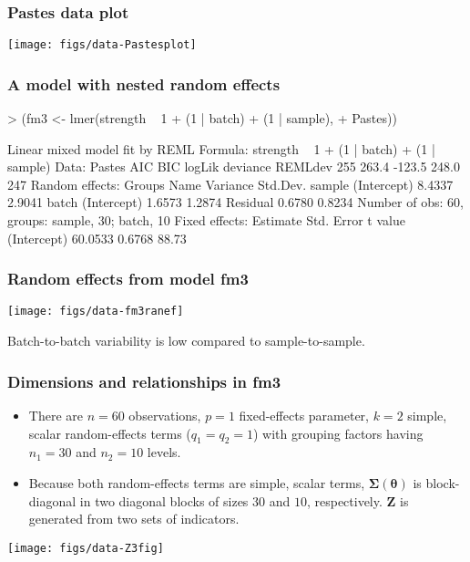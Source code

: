 \begin{frame}[fragile]
  \frametitle{Pastes data plot}
\texttt{[image: figs/data-Pastesplot]}
\end{frame}

\begin{frame}[fragile]
  \frametitle{A model with nested random effects}
\begin{Schunk}
\begin{Sinput}
> (fm3 <- lmer(strength ~ 1 + (1 | batch) + (1 | sample), 
+     Pastes))
\end{Sinput}
\begin{Soutput}
Linear mixed model fit by REML 
Formula: strength ~ 1 + (1 | batch) + (1 | sample) 
   Data: Pastes 
 AIC   BIC logLik deviance REMLdev
 255 263.4 -123.5    248.0     247
Random effects:
 Groups   Name        Variance Std.Dev.
 sample   (Intercept) 8.4337   2.9041  
 batch    (Intercept) 1.6573   1.2874  
 Residual             0.6780   0.8234  
Number of obs: 60, groups: sample, 30; batch, 10
Fixed effects:
            Estimate Std. Error t value
(Intercept)  60.0533     0.6768   88.73
\end{Soutput}
\end{Schunk}
\end{frame}

\begin{frame}[fragile]
  \frametitle{Random effects from model fm3}
  \begin{center}
\texttt{[image: figs/data-fm3ranef]}
  \end{center}
Batch-to-batch variability is low compared to sample-to-sample.
\end{frame}

\begin{frame}[fragile]
  \frametitle{Dimensions and relationships in fm3}
  \begin{itemize}
  \item There are $n=60$ observations, $p=1$ fixed-effects parameter,
    $k=2$ simple, scalar random-effects terms ($q_1=q_2=1$) with
    grouping factors having $n_1=30$ and $n_2=10$ levels.
  \item Because both random-effects terms are simple, scalar terms,
    $\bm\Sigma(\bm\theta)$ is block-diagonal in two diagonal blocks of
    sizes $30$ and $10$, respectively. $\bm Z$ is generated from two
    sets of indicators.
  \end{itemize}
  \begin{center}
\texttt{[image: figs/data-Z3fig]}
  \end{center}
\end{frame}

